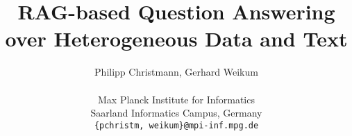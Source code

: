 \documentclass{article}
\begin{document}
\title{RAG-based Question Answering \\ over Heterogeneous Data and Text}

\author{
Philipp Christmann,
Gerhard Weikum\\\\
Max Planck Institute for Informatics\\
Saarland Informatics Campus, Germany\\
\texttt{\{pchristm, weikum\}@mpi-inf.mpg.de}}

\maketitle









\end{document}
